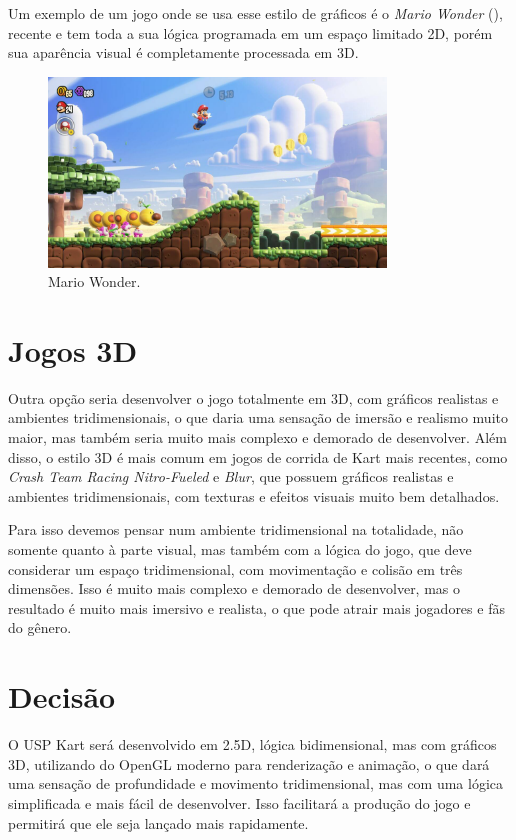 Um exemplo de um jogo onde se usa esse estilo de gráficos é o \textit{Mario Wonder} (\cite{marioWonder}), recente e tem toda a sua lógica programada em um espaço limitado 2D, porém sua aparência visual é completamente processada em 3D.

\begin{figure}[H]
    \centering
    \includegraphics[width=0.8\textwidth]{figuras/Mario Wonder.jpg}
    \caption{Mario Wonder. \cite{marioWonder}}
    \label{fig:mario-wonder}
\end{figure}

\section{Jogos 3D}

Outra opção seria desenvolver o jogo totalmente em 3D, com gráficos realistas e ambientes tridimensionais, o que daria uma sensação de imersão e realismo muito maior, mas também seria muito mais complexo e demorado de desenvolver. Além disso, o estilo 3D é mais comum em jogos de corrida de Kart mais recentes, como \textit{Crash Team Racing Nitro-Fueled} e \textit{Blur}, que possuem gráficos realistas e ambientes tridimensionais, com texturas e efeitos visuais muito bem detalhados.

Para isso devemos pensar num ambiente tridimensional na totalidade, não somente quanto à parte visual, mas também com a lógica do jogo, que deve considerar um espaço tridimensional, com movimentação e colisão em três dimensões. Isso é muito mais complexo e demorado de desenvolver, mas o resultado é muito mais imersivo e realista, o que pode atrair mais jogadores e fãs do gênero.

\section{Decisão}

O USP Kart será desenvolvido em 2.5D, lógica bidimensional, mas com gráficos 3D, utilizando do OpenGL moderno para renderização e animação, o que dará uma sensação de profundidade e movimento tridimensional, mas com uma lógica simplificada e mais fácil de desenvolver. Isso facilitará a produção do jogo e permitirá que ele seja lançado mais rapidamente.